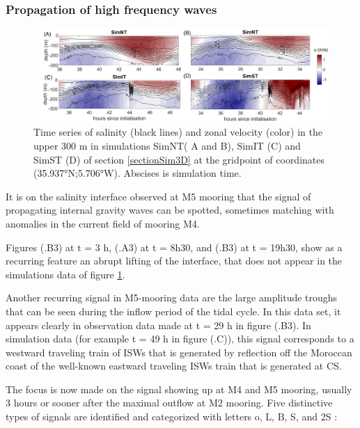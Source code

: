 \subsubsection{Propagation of high frequency waves}

\begin{figure}[!h]
 \includegraphics[width=\textwidth]{./GBR3D/US_M4SimMIV.png}
 \caption [Time series of salinity and zonal velocity in simulations SimNT, SimIT and SimST]{Time series of salinity (black lines) and zonal velocity (color) in the upper 300 m in simulations SimNT( A and B), SimIT (C) and SimST (D) of section \ref{sectionSim3D} at the gridpoint of coordinates (35.937°N;5.706°W). Abscises is simulation time. }
 \label{Fig_moor_USs}
\end{figure}

It is on the salinity interface observed at M5 mooring that the signal of propagating internal gravity waves can be spotted, sometimes matching with anomalies in the current field of mooring M4.

Figures (.B3) at t = 3 h, (.A3) at t = 8h30, and (.B3) at t = 19h30, show as a recurring feature an abrupt lifting of the interface, that does not appear in the simulations data of figure \ref{Fig_moor_USs}.

Another recurring signal in M5-mooring data are the large amplitude troughs that can be seen during the inflow period of the tidal cycle. In this data set, it appears clearly in observation data made at t = 29 h in figure (.B3). In simulation data (for example t = 49 h in figure (.C)), this signal corresponds to a westward traveling train of ISWs that is generated by reflection off the Moroccan coast of the well-known eastward traveling ISWs train that is generated at CS.

The focus is now made on the signal showing up at M4 and M5 mooring, usually 3 hours or sooner after the maximal outflow at M2 mooring. Five distinctive types of signals are identified and categorized with letters o, L, B, S, and 2S :


